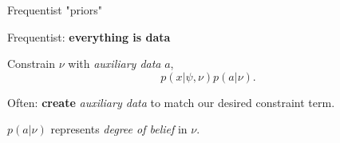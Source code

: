 \documentclass[
aspectratio=169,
14pt,
professionalfonts
]{beamer}
\begin{document}
\begin{frame}{Frequentist "priors"}
    \vspace{-0.5cm}
    \begin{minipage}{0.7\textwidth}
        \begin{center}
            Frequentist: \textbf{everything is data}
        \end{center}

        Constrain $\nu$ with \textit{auxiliary data} $a$,
        $$p(x| \psi, \nu) p(a| \nu).$$
        
        Often: \textbf{create} \textit{auxiliary data} to match our desired constraint term.

        \vspace{0.5cm}

        $p(a| \nu)$ represents \textit{degree of belief} in $\nu$.


\end{minipage}
\end{frame}
\end{document}
